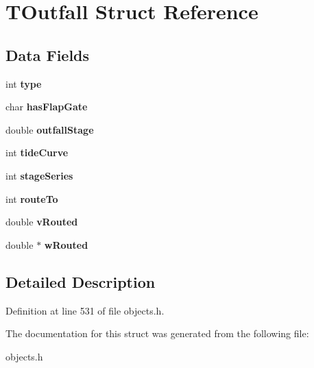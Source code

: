 \hypertarget{struct_t_outfall}{}\section{T\+Outfall Struct Reference}
\label{struct_t_outfall}
\subsection*{Data Fields}
\begin{DoxyCompactItemize}
\item 
\mbox{\label{struct_t_outfall_ac765329451135abec74c45e1897abf26}} 
int {\bfseries type}
\item 
\mbox{\label{struct_t_outfall_a7c9ade18411688959643cb89be16176f}} 
char {\bfseries has\+Flap\+Gate}
\item 
\mbox{\label{struct_t_outfall_ae642946c18e6eb9ce3e710843028d57d}} 
double {\bfseries outfall\+Stage}
\item 
\mbox{\label{struct_t_outfall_a43c36be2c2c63cb19da7ebea13aaa375}} 
int {\bfseries tide\+Curve}
\item 
\mbox{\label{struct_t_outfall_aef58e055614c0042f33227fc1102fbd1}} 
int {\bfseries stage\+Series}
\item 
\mbox{\label{struct_t_outfall_a4e8ddebcf941fea3602d15e052e844bf}} 
int {\bfseries route\+To}
\item 
\mbox{\label{struct_t_outfall_aa0a6f3146f84b9a57d29ce1d5fb06102}} 
double {\bfseries v\+Routed}
\item 
\mbox{\label{struct_t_outfall_aa3808196f83c1b335f469be268c0a4f1}} 
double $\ast$ {\bfseries w\+Routed}
\end{DoxyCompactItemize}


\subsection{Detailed Description}


Definition at line 531 of file objects.\+h.



The documentation for this struct was generated from the following file\+:\begin{DoxyCompactItemize}
\item 
objects.\+h\end{DoxyCompactItemize}
